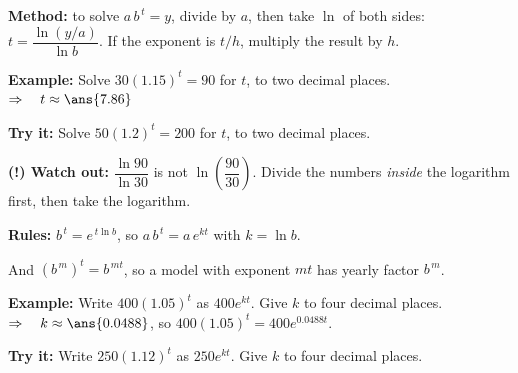 \documentclass[12pt]{article}
\begin{document}

\begin{formulabox}
\textbf{Method:} to solve $a\,b^{\,t} = y$, divide by $a$, then take $\ln$ of both sides:
$t = \dfrac{\ln(y/a)}{\ln b}$. \quad If the exponent is $t/h$, multiply the result by $h$.
\end{formulabox}

\begin{examplebox}
\textbf{Example:} \quad Solve $30(1.15)^t = 90$ for $t$, to two decimal places.
$\Rightarrow\quad t \approx \ans{7.86}$
\end{examplebox}

\begin{tryitbox}
\textbf{Try it:} \quad Solve $50(1.2)^t = 200$ for $t$, to two decimal places.\\[2pt]
\end{tryitbox}

\begin{watchoutbox}
\textbf{(!) Watch out:} $\dfrac{\ln 90}{\ln 30}$ is not $\ln\!\left(\dfrac{90}{30}\right)$. Divide the numbers \emph{inside} the logarithm first, then take the logarithm.
\end{watchoutbox}


\begin{formulabox}
\textbf{Rules:} $b^{\,t} = e^{\,t\ln b}$, so $a\,b^{\,t} = a\,e^{kt}$ with $k = \ln b$.\par
And $(b^{\,m})^{t} = b^{\,mt}$, so a model with exponent $mt$ has yearly factor $b^{\,m}$.
\end{formulabox}

\begin{examplebox}
\textbf{Example:} \quad Write $400(1.05)^t$ as $400e^{kt}$. Give $k$ to four decimal places.
$\Rightarrow\quad k \approx \ans{0.0488}$, so $400(1.05)^t = 400e^{0.0488t}$.
\end{examplebox}

\begin{tryitbox}
\textbf{Try it:} \quad Write $250(1.12)^t$ as $250e^{kt}$. Give $k$ to four decimal places.\\[2pt]
\end{tryitbox}
\end{document}
